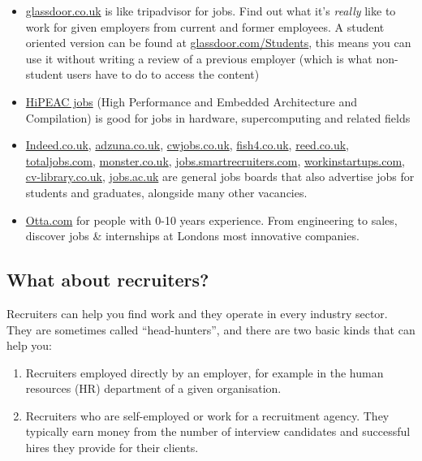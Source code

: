 \documentclass[
]{book}
\providecommand{\tightlist}{%
  \setlength{\itemsep}{0pt}\setlength{\parskip}{0pt}}
\begin{document}
\begin{itemize}
\tightlist
\item
  \href{http://www.glassdoor.co.uk/}{glassdoor.co.uk} is like tripadvisor for jobs. Find out what it's \emph{really} like to work for given employers from current and former employees. A student oriented version can be found at \href{https://www.glassdoor.com/Students}{glassdoor.com/Students}, this means you can use it without writing a review of a previous employer (which is what non-student users have to do to access the content)
\item
  \href{https://www.hipeac.net/jobs}{HiPEAC jobs} (High Performance and Embedded Architecture and Compilation) is good for jobs in hardware, supercomputing and related fields
\item
  \href{http://www.indeed.co.uk}{Indeed.co.uk}, \href{https://www.adzuna.co.uk}{adzuna.co.uk}, \href{https://www.cwjobs.co.uk/}{cwjobs.co.uk}, \href{https://www.fish4.co.uk}{fish4.co.uk}, \href{https://www.reed.co.uk/}{reed.co.uk}, \href{https://www.totaljobs.com}{totaljobs.com}, \href{https://www.monster.co.uk}{monster.co.uk}, \href{https://jobs.smartrecruiters.com}{jobs.smartrecruiters.com}, \href{https://workinstartups.com}{workinstartups.com}, \href{https://www.cv-library.co.uk}{cv-library.co.uk}, \href{https://www.jobs.ac.uk}{jobs.ac.uk} are general jobs boards that also advertise jobs for students and graduates, alongside many other vacancies.
\item
  \href{https://otta.com/}{Otta.com} for people with 0-10 years experience. From engineering to sales, discover jobs \& internships at London\textquotesingle s most innovative companies.
\end{itemize}

\hypertarget{recruiters}{%
\subsection{What about recruiters?}\label{recruiters}}

Recruiters can help you find work and they operate in every industry sector. They are sometimes called ``head-hunters'', and there are two basic kinds that can help you:

\begin{enumerate}
\def\labelenumi{\arabic{enumi}.}
\tightlist
\item
  Recruiters employed directly by an employer, for example in the human resources (HR) department of a given organisation.
\item
  Recruiters who are self-employed or work for a recruitment agency. They typically earn money from the number of interview candidates and successful hires they provide for their clients.
\end{enumerate}
\end{document}
